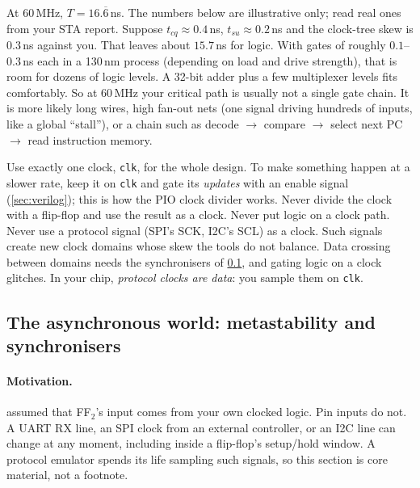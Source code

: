 \begin{example}
At 60\,MHz, $T = 16.\overline{6}$\,ns. The numbers below are illustrative
only; read real ones from your STA report. Suppose $t_{cq}\approx0.4$\,ns,
$t_{su}\approx0.2$\,ns and the clock-tree skew is $0.3$\,ns against you.
That leaves about $15.7$\,ns for logic. With gates of roughly
$0.1$--$0.3$\,ns each in a 130\,nm process (depending on load and drive
strength), that is room for dozens of logic levels. A 32-bit adder plus a
few multiplexer levels fits comfortably. So at 60\,MHz your critical path is
usually not a single gate chain. It is more likely long wires, high fan-out
nets (one signal driving hundreds of inputs, like a global ``stall''), or a
chain such as decode $\to$ compare $\to$ select next PC $\to$ read
instruction memory.
\end{example}

\begin{remark}
Use exactly one clock, \texttt{clk}, for the whole design. To make something
happen at a slower rate, keep it on \texttt{clk} and gate its \emph{updates}
with an enable signal (\cref{sec:verilog}); this is how the PIO clock divider
works. Never divide the clock with a flip-flop and use the result as a
clock. Never put logic on a clock path. Never use a protocol signal (SPI's
SCK, I2C's SCL) as a clock. Such signals create new clock domains whose
skew the tools do not balance. Data crossing between domains needs the
synchronisers of \cref{sec:meta}, and gating logic on a clock glitches. In
your chip, \emph{protocol clocks are data}: you sample them on \texttt{clk}.
\end{remark}

\subsection{The asynchronous world: metastability and synchronisers}
\label{sec:meta}

\paragraph{Motivation.}  assumed that FF$_2$'s input comes
from your own clocked logic. Pin inputs do not. A UART RX line, an SPI clock
from an external controller, or an I2C line can change at any moment,
including inside a flip-flop's setup/hold window. A protocol emulator spends
its life sampling such signals, so this section is core material, not a
footnote.

